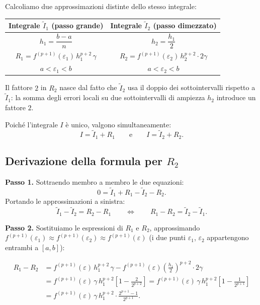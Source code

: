 \documentclass[a4paper,12pt]{article}
\theoremstyle{definition}
\theoremstyle{remark}
\begin{document}
Calcoliamo due approssimazioni distinte dello stesso integrale:

\begin{center}
\begin{tabular}{|c|c|}
\hline
\textbf{Integrale $\tilde{I}_1$ (passo grande)} & \textbf{Integrale $\tilde{I}_2$ (passo dimezzato)} \\
\hline
$h_1 = \dfrac{b-a}{n}$ & $h_2 = \dfrac{h_1}{2}$ \\[8pt]
$R_1 = f^{(p+1)}(\varepsilon_1)\,h_1^{p+2}\,\gamma$ &
$R_2 = f^{(p+1)}(\varepsilon_2)\,h_2^{p+2}\cdot 2\gamma$ \\[6pt]
$a < \varepsilon_1 < b$ & $a < \varepsilon_2 < b$ \\
\hline
\end{tabular}
\end{center}

\noindent Il fattore $2$ in $R_2$ nasce dal fatto che $\tilde{I}_2$ usa il
doppio dei sottointervalli rispetto a $\tilde{I}_1$: la somma degli errori
locali su due sottointervalli di ampiezza $h_2$ introduce un fattore $2$.

Poiché l'integrale $I$ è unico, valgono simultaneamente:
\[
  I = \tilde{I}_1 + R_1 \qquad \text{e} \qquad I = \tilde{I}_2 + R_2.
\]

\subsection{Derivazione della formula per $R_2$}

\noindent\textbf{Passo 1.} Sottraendo membro a membro le due equazioni:
\[
  0 = \tilde{I}_1 + R_1 - \tilde{I}_2 - R_2.
\]
Portando le approssimazioni a sinistra:
\begin{equation}
  \tilde{I}_1 - \tilde{I}_2 = R_2 - R_1 \qquad \Longleftrightarrow \qquad
  R_1 - R_2 = \tilde{I}_2 - \tilde{I}_1.
  \label{eq:diff-I-resto}
\end{equation}

\noindent\textbf{Passo 2.} Sostituiamo le espressioni di $R_1$ e $R_2$,
approssimando $f^{(p+1)}(\varepsilon_1) \approx f^{(p+1)}(\varepsilon_2)
\approx f^{(p+1)}(\varepsilon)$ (i due punti $\varepsilon_1$, $\varepsilon_2$
appartengono entrambi a $[a,b]$):

\begin{align*}
  R_1 - R_2
  &= f^{(p+1)}(\varepsilon)\,h_1^{p+2}\,\gamma
   - f^{(p+1)}(\varepsilon)\!\left(\frac{h_1}{2}\right)^{\!p+2}\!\cdot 2\gamma \\[4pt]
  &= f^{(p+1)}(\varepsilon)\,\gamma\,h_1^{p+2}
     \left[1 - \frac{2}{2^{p+2}}\right]
   = f^{(p+1)}(\varepsilon)\,\gamma\,h_1^{p+2}
     \left[1 - \frac{1}{2^{p+1}}\right] \\[4pt]
  &= f^{(p+1)}(\varepsilon)\,\gamma\,h_1^{p+2}\cdot
     \frac{2^{p+1}-1}{2^{p+1}}.
\end{align*}
\end{document}
